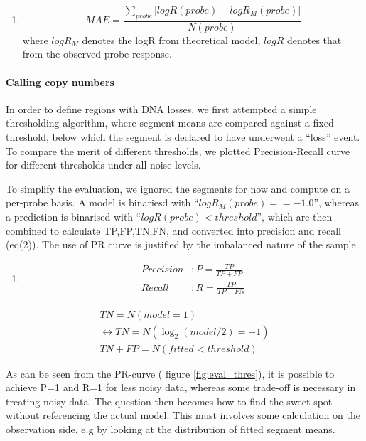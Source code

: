 \documentclass[]{article}
\providecommand{\tightlist}{%
  \setlength{\itemsep}{0pt}\setlength{\parskip}{0pt}}
\let\oldparagraph\paragraph
\renewcommand{\paragraph}[1]{\oldparagraph{#1}\mbox{}}
\begin{document}
\begin{enumerate}
\def\labelenumi{(\arabic{enumi})}
\tightlist
\item
  \[
  MAE=\frac{\sum_{probe}{|logR(probe)-logR_M(probe)}|}{N(probe)}
  \] where \(logR_M\) denotes the logR from theoretical model, \(logR\)
  denotes that from the observed probe response.
\end{enumerate}

\paragraph{Calling copy numbers}\label{calling-copy-numbers}

In order to define regions with DNA losses, we first attempted a simple
thresholding algorithm, where segment means are compared against a fixed
threshold, below which the segment is declared to have underwent a
``loss'' event. To compare the merit of different thresholds, we plotted
Precision-Recall curve for different thresholds under all noise levels.

To simplify the evaluation, we ignored the segments for now and compute
on a per-probe basis. A model is binariesd with
``\(logR_M(probe) == -1.0\)'', whereas a prediction is binarised with
``\(logR(probe) < threshold\)'', which are then combined to calculate
TP,FP,TN,FN, and converted into precision and recall (eq(2)). The use of
PR curve is justified by the imbalanced nature of the sample.

\begin{enumerate}
\def\labelenumi{(\arabic{enumi})}
\setcounter{enumi}{1}
\tightlist
\item
  \[
  \begin{aligned}
  Precision &: P = \frac{TP}{TP+FP} \\
  Recall &: R = \frac{TP}{TP+FN}
  \end{aligned}
  \]
\end{enumerate}

\[
\begin{aligned}
TN = N( model = 1) \\ 
\leftrightarrow TN = N( \log_2{(model/2)} = -1) \\ 
TN + FP = N(fitted < threshold)
\end{aligned}
\]

As can be seen from the PR-curve ( figure \ref{fig:eval_thres}), it is
possible to achieve P=1 and R=1 for less noisy data, whereas some
trade-off is necessary in treating noisy data. The question then becomes
how to find the sweet spot without referencing the actual model. This
must involves some calculation on the observation side, e.g by looking
at the distribution of fitted segment means.
\end{document}
